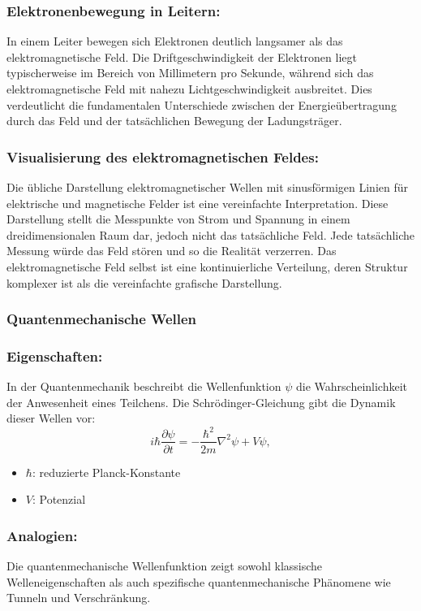\documentclass[12pt,a4paper]{article}
\begin{document}
	\subsubsection{Elektronenbewegung in Leitern:}
	In einem Leiter bewegen sich Elektronen deutlich langsamer als das elektromagnetische Feld. Die Driftgeschwindigkeit der Elektronen liegt typischerweise im Bereich von Millimetern pro Sekunde, während sich das elektromagnetische Feld mit nahezu Lichtgeschwindigkeit ausbreitet. Dies verdeutlicht die fundamentalen Unterschiede zwischen der Energieübertragung durch das Feld und der tatsächlichen Bewegung der Ladungsträger.
	
	\subsubsection{Visualisierung des elektromagnetischen Feldes:}
	Die übliche Darstellung elektromagnetischer Wellen mit sinusförmigen Linien für elektrische und magnetische Felder ist eine vereinfachte Interpretation. Diese Darstellung stellt die Messpunkte von Strom und Spannung in einem dreidimensionalen Raum dar, jedoch nicht das tatsächliche Feld. Jede tatsächliche Messung würde das Feld stören und so die Realität verzerren. Das elektromagnetische Feld selbst ist eine kontinuierliche Verteilung, deren Struktur komplexer ist als die vereinfachte grafische Darstellung.
	
	\subsubsection{Quantenmechanische Wellen}
	
	\subsubsection{Eigenschaften:}
	In der Quantenmechanik beschreibt die Wellenfunktion $\psi$ die Wahrscheinlichkeit der Anwesenheit eines Teilchens. Die Schrödinger-Gleichung gibt die Dynamik dieser Wellen vor:
	\begin{equation}
		i \hbar \frac{\partial \psi}{\partial t} = -\frac{\hbar^2}{2m} \nabla^2 \psi + V \psi,
	\end{equation}
	\begin{itemize}
		\item $\hbar$: reduzierte Planck-Konstante
		\item $V$: Potenzial
	\end{itemize}
	
	\subsubsection{Analogien:}
	Die quantenmechanische Wellenfunktion zeigt sowohl klassische Welleneigenschaften als auch spezifische quantenmechanische Phänomene wie Tunneln und Verschränkung.
	
\end{document}

